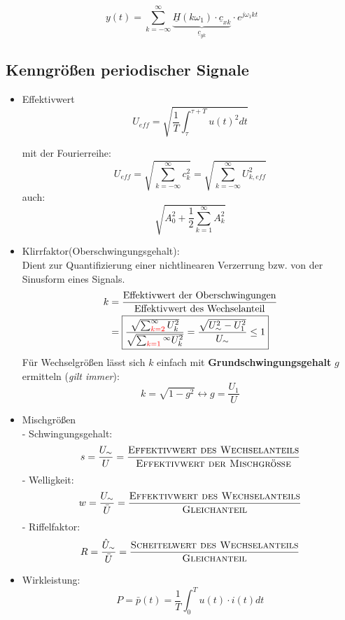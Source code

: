 \[
    y(t) = \sum_{k=-\infty}^{\infty} \underbrace{\underline{H}(k\omega_1)\cdot\underline{c}_{xk}}_{\underline{c}_{yk}} \cdot e^{j\omega_1 k t}
\]

\subsection{Kenngrößen periodischer Signale}
\begin{itemize}
    \item Effektivwert
        \[
            \boxed{U_{\mathit{eff}} = \sqrt{\frac{1}{T} \int_\tau^{\tau+T} u(t)^2 dt}}
        \]
    \begin{mdframed}[style=exercise]
        mit der Fourierreihe:
        $$ U_{\mathit{eff}} = \sqrt{\sum_{k=-\infty}^{\infty} c_k^2} = \sqrt{\sum_{k=-\infty}^{\infty}U_{k,\mathit{eff}}^2} $$
        auch:
        $$ \sqrt{A_0^2 + \frac{1}{2} \sum_{k=1}^{\infty} A_k^2} $$
    \end{mdframed}
    \item Klirrfaktor(Oberschwingungsgehalt):\\
        Dient zur Quantifizierung einer nichtlinearen Verzerrung bzw. von der
        Sinusform eines Signals.
        \begin{align*}
            k &= \frac{\text{Effektivwert der Oberschwingungen}}{\text{Effektivwert des Wechselanteil}} \\
            &= \boxed{\frac{\sqrt{\sum_{{\color{red}{k=2}}}^{\infty} U_{k}^{2}}}{\sqrt{\sum_{\color{red}{k=1}}^{\infty} U_{k}^{2}}} = \frac{\sqrt{U_\sim^2 - U_1^2}}{U_\sim} \leq 1}
        \end{align*}
        Für Wechselgrößen lässt sich $k$ einfach mit \textbf{Grundschwingungsgehalt} $g$ ermitteln (\textit{gilt immer}):
        \[
            \boxed{k = \sqrt{1-g^2} \leftrightarrow g = \frac{U_1}{U}}
        \]
    \item Mischgrößen\\
        - Schwingungsgehalt:
        \[
            s = \frac{U_\sim}{U} = \frac{\textsc{Effektivwert des Wechselanteils}}{\textsc{Effektivwert der Mischgröße}}
        \]
        - Welligkeit:
        \[
            w = \frac{U_\sim}{\bar{U}} = \frac{\textsc{Effektivwert des Wechselanteils}}{\textsc{Gleichanteil}}
        \]
        - Riffelfaktor:
        \[
            R = \frac{\hat{U}_\sim}{\bar{U}} = \frac{\textsc{Scheitelwert des Wechselanteils}}{\textsc{Gleichanteil}}
        \]
    \item Wirkleistung:
        \[
            P = \bar{p}(t) = \frac{1}{T} \int_0^T u(t)\cdot i(t) dt
\]
\end{itemize}
